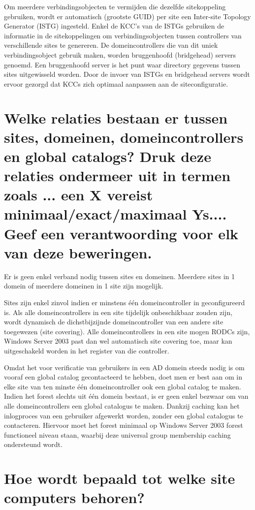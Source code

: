 Om meerdere verbindingsobjecten te vermijden die dezelfde sitekoppeling
gebruiken, wordt er automatisch (grootste GUID) per site een Inter-site Topology
Generator (ISTG) ingesteld. Enkel de KCC's van de ISTGs gebruiken de informatie
in de sitekoppelingen om verbindingsobjecten tussen controllers van
verschillende sites te genereren. De domeincontrollers die van dit uniek
verbindingsobject gebruik maken, worden bruggenhoofd (bridgehead) servers
genoemd. Een bruggenhoofd server is het punt waar directory gegevens tussen
sites uitgewisseld worden. Door de invoer van ISTGs en bridgehead servers wordt
ervoor gezorgd dat KCCs zich optimaal aanpassen aan de siteconfiguratie.

\section{Welke relaties bestaan er tussen sites, domeinen, domeincontrollers en
global catalogs? Druk deze relaties ondermeer uit in termen zoals ... een X
vereist minimaal/exact/maximaal Ys.... Geef een verantwoording voor elk van
deze beweringen.}

Er is geen enkel verband nodig tussen sites en domeinen. Meerdere sites in 1
domein of meerdere domeinen in 1 site zijn mogelijk.

Sites zijn enkel zinvol indien er minstens één domeincontroller in
geconfigureerd is. Als alle domeincontrollers in een site tijdelijk
onbeschikbaar zouden zijn, wordt dynamisch de dichstbijzijnde domeincontroller
van een andere site toegewezen (site covering). Alle domeincontrollers in een
site mogen RODCs zijn, Windows Server 2003 past dan wel automatisch site
covering toe, maar kan uitgeschakeld worden in het register van die controller.

Omdat het voor verificatie van gebruikers in een AD domein steeds nodig is om
vooraf een global catalog gecontacteerd te hebben, doet men er best aan om in
elke site van ten minste één domeincontroller ook een global catalog te maken.
Indien het forest slechts uit één domein bestaat, is er geen enkel bezwaar om
van alle domeincontrollers een global catalogus te maken. Dankzij caching kan
het inlogproces van een gebruiker afgewerkt worden, zonder een global catalogus
te contacteren. Hiervoor moet het forest minimaal op Windows Server 2003 forest
functioneel niveau staan, waarbij deze universal group membership caching 
ondersteund wordt.

\section{Hoe wordt bepaald tot welke site computers behoren?}

